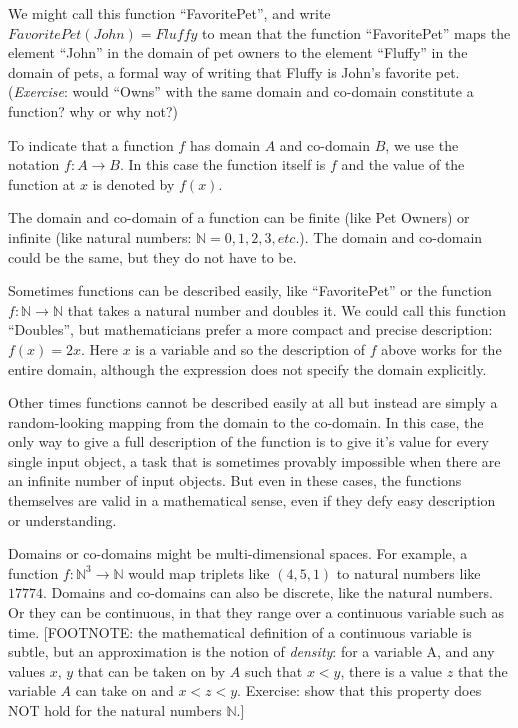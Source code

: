 \documentclass[UTF8]{book}
\begin{document}
\begin{CJK}{UTF8}{gbsn}
We might call this function ``FavoritePet'', and write $FavoritePet(John) = Fluffy$ to mean that the function ``FavoritePet'' maps the element ``John'' in the domain of pet owners to the element ``Fluffy'' in the domain of pets, a formal way of writing that Fluffy is John's favorite pet. (\emph{Exercise}: would ``Owns'' with the same domain and co-domain constitute a function? why or why not?)

To indicate that a function $f$ has domain $A$ and co-domain $B$, we use the notation $f: A \rightarrow B$. In this case the function itself is $f$ and the value of the function at $x$ is denoted by $f(x)$.

The domain and co-domain of a function can be finite (like Pet Owners) or infinite (like natural numbers: $\mathbb{N} = {0, 1, 2, 3, etc.}$). The domain and co-domain could be the same, but they do not have to be.

Sometimes functions can be described easily, like ``FavoritePet'' or the function $f: \mathbb{N} \rightarrow \mathbb{N}$ that takes a natural number and doubles it. We could call this function ``Doubles'', but mathematicians prefer a more compact and precise description: $f(x) = 2x$. Here $x$ is a variable and so the description of $f$ above works for the entire domain, although the expression does not specify the domain explicitly.

Other times functions cannot be described easily at all but instead are simply a random-looking mapping from the domain to the co-domain. In this case, the only way to give a full description of the function is to give it's value for every single input object, a task that is sometimes provably impossible when there are an infinite number of input objects. But even in these cases, the functions themselves are valid in a mathematical sense, even if they defy easy description or understanding.

Domains or co-domains might be multi-dimensional spaces. For example, a function $f: \mathbb{N}^{3} \rightarrow \mathbb{N}$ would map triplets like $(4,5,1)$ to natural numbers like $17774$. Domains and co-domains can also be discrete, like the natural numbers. Or they can be continuous, in that they range over a continuous variable such as time. [FOOTNOTE: the mathematical definition of a continuous variable is subtle, but an approximation is the notion of \emph{density}: for a variable A, and any values $x$, $y$ that can be taken on by $A$ such that $x < y$, there is a value $z$ that the variable $A$ can take on and $x < z < y$. Exercise: show that this property does NOT hold for the natural numbers $\mathbb{N}$.]


\end{CJK}
\end{document}
